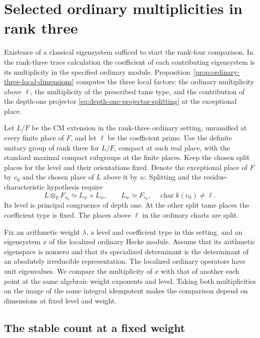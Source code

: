 \section{Selected ordinary multiplicities in rank three}
\label{sec:rank-three-multiplicity}
\hypertarget{source-ordinary-rank-three-multiplicity}{}

Existence of a classical eigensystem sufficed to start the rank-four comparison. In the rank-three trace calculation the coefficient of each contributing eigensystem is its multiplicity in the specified ordinary module. Proposition~\ref{prop:ordinary-three-local-dimensions} computes the three local factors: the ordinary multiplicity above \(\ell\), the multiplicity of the prescribed tame type, and the contribution of the depth-one projector \eqref{eq:depth-one-projector-splitting} at the exceptional place.

Let \(L/F\) be the CM extension in the rank-three ordinary
setting, unramified at every finite place of \(F\), and let
\(\ell\) be the coefficient prime. Use the definite unitary group of rank three for \(L/F\), compact at each real place, with the standard maximal compact subgroups at the finite places. Keep the
chosen split places for the level and their orientations
fixed. Denote the exceptional place of \(F\) by \(v_0\) and the chosen place of \(L\) above it by \(w\). Splitting and the residue-characteristic hypothesis require
\[
 L\otimes_F F_{v_0}\simeq L_w\times L_{\bar w},\qquad L_w\simeq F_{v_0},\quad \operatorname{char} k(v_0)\ne\ell .
\] Its level is
principal congruence of depth one. At the other split tame
places the coefficient type is fixed. The places above
\(\ell\) in the ordinary charts are split.

Fix an arithmetic weight \(\lambda\), a level and coefficient
type in this setting, and an eigensystem \(x\) of the
localized ordinary Hecke module. Assume that its arithmetic
eigenspace is nonzero and that its specialized determinant
is the determinant of an absolutely irreducible
representation. The localized ordinary operators have
unit eigenvalues. We compare the multiplicity of \(x\)
with that of another such point at the same algebraic weight
exponents and level. Taking both multiplicities on the image of the same integral idempotent makes the comparison depend on dimensions at fixed level and weight.

\subsection{The stable count at a fixed weight}
\label{sec:rank-three-stable-count}

